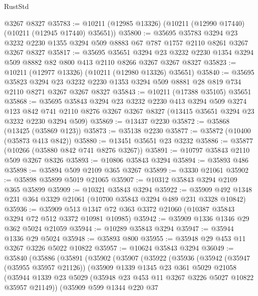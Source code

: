 \begin{lexlean}{RustStd}
\begin{coremodule}
    @3267
    @8327
@35783 := @10211 (@12985 @13326) (@10211 (@12990 @17440) (@10211 (@12945 @17440) @35651))
@35800 := @35695
    @35783
    @3294
    @23
    @3232
    @2230
    @1355
    @3294
    @509
    @8883
    @67
    @787
    @1757
    @2110
    @8261
    @3267
    @3267
    @8327
@35817 := @35695
    @35651
    @3294
    @23
    @3232
    @2230
    @1354
    @3294
    @509
    @8882
    @82
    @800
    @413
    @2110
    @8266
    @3267
    @3267
    @8327
@35823 := @10211 (@12977 @13326) (@10211 (@12980 @13326) @35651)
@35840 := @35695
    @35823
    @3294
    @23
    @3232
    @2230
    @1353
    @3294
    @509
    @8881
    @28
    @819
    @734
    @2110
    @8271
    @3267
    @3267
    @8327
@35843 := @10211 (@17388 @35105) @35651
@35868 := @35695
    @35843
    @3294
    @23
    @3232
    @2230
    @413
    @3294
    @509
    @3274
    @123
    @842
    @741
    @2110
    @8276
    @3267
    @3267
    @8327
    (@13415 @35651 @3294 @23 @3232 @2230 @3294 @509)
@35869 := @13437 @2230
@35872 := @35868 (@13425 (@35869 @123))
@35873 := @35138 @2230
@35877 := @35872 (@10400 (@35873 @413 @842))
@35880 := @13451 @35651 @23 @3232
@35886 := @35877 (@10266 (@35880 @842 @741 @8276 @3267))
@35891 := @10797 @35843 @2110 @509 @3267 @8326
@35893 := @10806 @35843 @3294
@35894 := @35893 @486
@35898 := @35894 @509 @2109 @365 @3267
@35899 := @3330 @21061
@35902 := @35898 @35899 @5019 @21065
@35907 := @10312 @35843 @3294 @2109 @365 @35899
@35909 := @10321 @35843 @3294
@35922 := @35909 @492 @1348 @231 @364 @3329 @21061 (@10700 @35843 @3294 @489 @231 @3328 @10842)
@35936 := @35909 @513 @1347 @72 @363 @3372 @21060 (@10387 @35843 @3294 @72 @512 @3372 @10981 @10985)
@35942 := @35909 @1336 @1346 @29 @362 @5024 @21059
@35944 := @10289 @35843 @3294
@35947 := @35944 @1336 @29 @5024
@35948 := @35893 @800
@35955 := @35948 @29 @453 @11 @3267 @3226 @5022 @10822
@35957 := @10624 @35843 @3294
@36049 := @35840
    (@35886
      (@35891
        (@35902
          (@35907
            (@35922
              (@35936
                (@35942
                  (@35947 (@35955 @35957 @21126))
                  (@35909
                    @1339
                    @1345
                    @23
                    @361
                    @5029
                    @21058
                    (@35944
                      @1339
                      @23
                      @5029
                      (@35948 @23 @453 @11 @3267 @3226 @5027 @10822 @35957 @21149))
                    (@35909
                      @599
                      @1344
                      @220
                      @37

\end{coremodule}
\end{lexlean}
